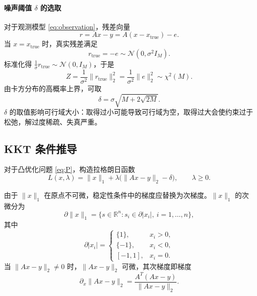 \documentclass[UTF8]{ctexart}
\numberwithin{figure}{section}
\theoremstyle{definition}
\theoremstyle{examplestyle}
\theoremstyle{remark}
\begin{document}
\paragraph*{噪声阈值 $\delta$ 的选取}
对于观测模型 \eqref{eq:observation}，残差向量
\[
r=Ax-y=A(x-x_{\mathrm{true}})-e.
\]
当 $x=x_{\mathrm{true}}$ 时，真实残差满足
\[
r_{\mathrm{true}}=-e\sim\mathcal{N}(0,\sigma^2 I_M).
\]
标准化得 $\frac{1}{\sigma}r_{\mathrm{true}}\sim\mathcal{N}(0,I_M)$，于是
\begin{equation}
\label{eq:chi2}
Z=\frac{1}{\sigma^2}\|r_{\mathrm{true}}\|_2^2=\frac{1}{\sigma^2}\|e\|_2^2\sim\chi^2(M).
\end{equation}
由卡方分布的高概率上界，可取
\begin{equation}
\label{eq:delta}
\delta=\sigma\sqrt{M+2\sqrt{2M}}.
\end{equation}
$\delta$ 的取值影响可行域大小：取得过小可能导致可行域为空，取得过大会使约束过于松弛，解过度稀疏、失真严重。

\subsection{KKT 条件推导}
\label{sec:kkt}

对于凸优化问题 \eqref{eq:P}，构造拉格朗日函数
\begin{equation}
\label{eq:Lagrangian}
L(x,\lambda)=\|x\|_1+\lambda\bigl(\|Ax-y\|_2-\delta\bigr), \qquad \lambda\ge0.
\end{equation}

由于 $\|x\|_1$ 在原点不可微，稳定性条件中的梯度应替换为次梯度。$\|x\|_1$ 的次微分为
\begin{equation}
\label{eq:subdiff}
\partial\|x\|_1=\bigl\{s\in\mathbb{R}^n : s_i\in\partial|x_i|,\ i=1,\dots,n\bigr\},
\end{equation}
其中
\begin{equation}
\label{eq:subdiff_component}
\partial|x_i|=
\begin{cases}
\{1\}, & x_i>0,\\
\{-1\}, & x_i<0,\\
[-1,1], & x_i=0.
\end{cases}
\end{equation}
当 $\|Ax-y\|_2\neq0$ 时，$\|Ax-y\|_2$ 可微，其次梯度即梯度
\begin{equation}
\label{eq:gradnorm}
\partial_x\|Ax-y\|_2=\frac{A^T(Ax-y)}{\|Ax-y\|_2}.
\end{equation}
\end{document}
